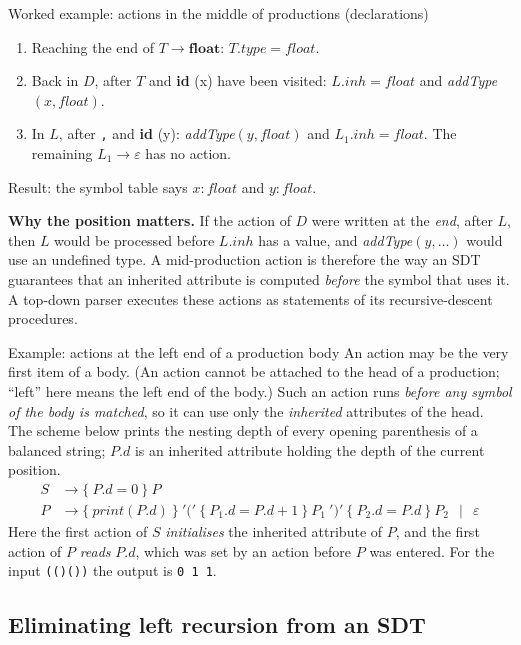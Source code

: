 \documentclass[11pt,a4paper]{article}
\newcommand{\at}[2]{\ensuremath{#1.\mathit{#2}}}
\newcommand{\tok}[1]{\ensuremath{\mathtt{#1}}}
\begin{document}
\begin{examplebox}{Worked example: actions in the middle of productions (declarations)}
\begin{enumerate}[nosep,label=(\arabic*)]
\item Reaching the end of $T\to\mathbf{float}$: $\at{T}{type}=float$.
\item Back in $D$, after $T$ and \textbf{id} (x) have been visited: $\at{L}{inh}=float$ and \textit{addType}$(x, float)$.
\item In $L$, after \texttt{,} and \textbf{id} (y): \textit{addType}$(y, float)$ and $\at{L_1}{inh}=float$. The remaining $L_1\to\varepsilon$ has no action.
\end{enumerate}
Result: the symbol table says $x:float$ and $y:float$.

\textbf{Why the position matters.} If the action of $D$ were written at the \emph{end}, after $L$, then $L$ would be processed before $\at{L}{inh}$ has a value, and \textit{addType}$(y,\dots)$ would use an undefined type. A mid-production action is therefore the way an SDT guarantees that an inherited attribute is computed \emph{before} the symbol that uses it. A top-down parser executes these actions as statements of its recursive-descent procedures.
\end{examplebox}

\begin{examplebox}{Example: actions at the left end of a production body}
An action may be the very first item of a body. (An action cannot be attached to the head of a production; ``left'' here means the left end of the body.) Such an action runs \emph{before any symbol of the body is matched}, so it can use only the \emph{inherited} attributes of the head. The scheme below prints the nesting depth of every opening parenthesis of a balanced string; $P.d$ is an inherited attribute holding the depth of the current position.
\begin{align*}
S &\to \{\ \at{P}{d}=0\ \}\ P\\
P &\to \{\ \mathit{print}(\at{P}{d})\ \}\ \tok{'('}\ \{\ \at{P_1}{d}=\at{P}{d}+1\ \}\ P_1\ \tok{')'}\ \{\ \at{P_2}{d}=\at{P}{d}\ \}\ P_2\ \ \mid\ \ \varepsilon
\end{align*}
Here the first action of $S$ \emph{initialises} the inherited attribute of $P$, and the first action of $P$ \emph{reads} $\at{P}{d}$, which was set by an action before $P$ was entered. For the input \texttt{(()())} the output is \texttt{0 1 1}.
\end{examplebox}

\subsection{Eliminating left recursion from an SDT}
\label{sec:leftrec}
\end{document}
